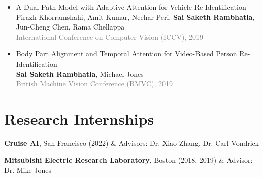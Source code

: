\documentclass[10pt, letterpaper]{article}
\newcommand{\pub}[3]{\item \begin{minipage}[t]{\linewidth}#1\\#2\\\textcolor{gray}{#3}\end{minipage}} %
\newcommand{\me}{\textbf{Sai Saketh Rambhatla}} %
\let\originalTabularx\tabularx
\let\originalEndTabularx\endtabularx
\renewenvironment{tabularx}{\bgroup\centering\originalTabularx}{\originalEndTabularx\par\egroup}
\begin{document}
\begin{itemize}[itemsep=3pt, parsep=0pt, topsep=2pt]
\pub{A Dual-Path Model with Adaptive Attention for Vehicle Re-Identification}
    {Pirazh Khorramshahi, Amit Kumar, Neehar Peri, \me, Jun-Cheng Chen, Rama Chellappa}
    {International Conference on Computer Vision (ICCV), 2019}

\pub{Body Part Alignment and Temporal Attention for Video-Based Person Re-Identification}
    {\me, Michael Jones}
    {British Machine Vision Conference (BMVC), 2019}



\end{itemize}

    
    \section{Research Internships}

\begin{tabularx}{\textwidth-0.4cm-0.13cm}{@{}lX@{}}
    \textbf{Cruise AI}, San Francisco (2022) & \hfill Advisors: \textcolor{advisorcolor}{Dr. Xiao Zhang, Dr. Carl Vondrick}\\
\end{tabularx}
\begin{tabularx}{\textwidth-0.4cm-0.13cm}{@{}lX@{}}
    \textbf{Mitsubishi Electric Research Laboratory}, Boston (2018, 2019) & \hfill Advisor: \textcolor{advisorcolor}{Dr. Mike Jones}\\
\end{tabularx}
\end{document}
